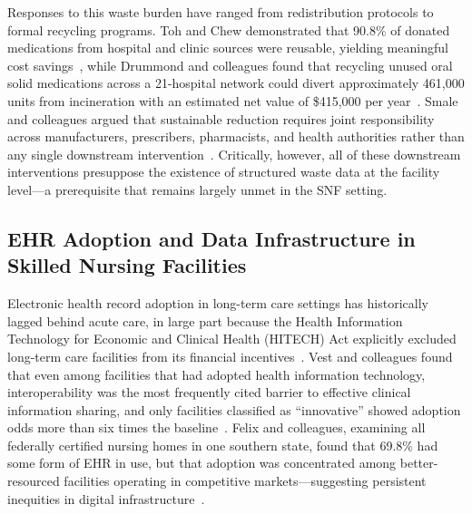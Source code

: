 \documentclass[letterpaper, 10pt, conference]{IEEEconf}
\begin{document}
Responses to this waste burden have ranged from redistribution protocols to
formal recycling programs.
Toh and Chew demonstrated that 90.8\% of donated medications from hospital and
clinic sources were reusable, yielding meaningful cost
savings~\cite{Toh2017Turning}, while Drummond and colleagues found that
recycling unused oral solid medications across a 21-hospital network could
divert approximately 461,000 units from incineration with an estimated net
value of \$415,000 per year~\cite{Drummond2023Recycling}.
Smale and colleagues argued that sustainable reduction requires joint
responsibility across manufacturers, prescribers, pharmacists, and health
authorities rather than any single downstream
intervention~\cite{Smale2021Waste-minimising}.
Critically, however, all of these downstream interventions presuppose the
existence of structured waste data at the facility level---a prerequisite
that remains largely unmet in the SNF setting.

\subsection{EHR Adoption and Data Infrastructure in Skilled Nursing Facilities}

Electronic health record adoption in long-term care settings has historically
lagged behind acute care, in large part because the Health Information
Technology for Economic and Clinical Health (HITECH) Act explicitly excluded
long-term care facilities from its financial
incentives~\cite{Kruse2015Adoption}.
Vest and colleagues found that even among facilities that had adopted health
information technology, interoperability was the most frequently cited barrier
to effective clinical information sharing, and only facilities classified as
``innovative'' showed adoption odds more than six times the
baseline~\cite{Vest2019Adoption}.
Felix and colleagues, examining all federally certified nursing homes in one
southern state, found that 69.8\% had some form of EHR in use, but that
adoption was concentrated among better-resourced facilities operating in
competitive markets---suggesting persistent inequities in digital
infrastructure~\cite{Felix2020Organizational}.
\end{document}
